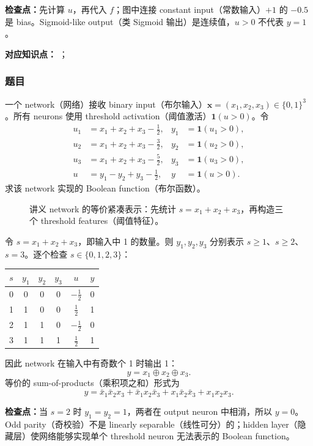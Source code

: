 \textbf{检查点：}先计算 $u$，再代入 $f$；图中连接 constant input（常数输入）$+1$ 的 $-0.5$ 是 bias。Sigmoid-like output（类 Sigmoid 输出）是连续值，$u>0$ 不代表 $y=1$。


\textbf{对应知识点：}
；

\subsubsection*{题目}

一个 network（网络）接收 binary input（布尔输入）$\bm x=(x_1,x_2,x_3)\in\{0,1\}^3$。所有 neurons 使用 threshold activation（阈值激活）$\mathbf 1(u>0)$。令
\begin{align*}
  u_1&=x_1+x_2+x_3-\tfrac12,& y_1&=\mathbf 1(u_1>0),\\
  u_2&=x_1+x_2+x_3-\tfrac32,& y_2&=\mathbf 1(u_2>0),\\
  u_3&=x_1+x_2+x_3-\tfrac52,& y_3&=\mathbf 1(u_3>0),\\
  u&=y_1-y_2+y_3-\tfrac12,& y&=\mathbf 1(u>0).
\end{align*}
求该 network 实现的 Boolean function（布尔函数）。

\begin{figure}[htbp]
  \centering
  \resizebox{0.9\textwidth}{!}{}
  \caption{讲义 network 的等价紧凑表示：先统计 $s=x_1+x_2+x_3$，再构造三个 threshold features（阈值特征）。}
  \label{fig:sc4001-l01-parity-network}
\end{figure}

\begin{checkedsolution}
令 $s=x_1+x_2+x_3$，即输入中 1 的数量。则 $y_1,y_2,y_3$ 分别表示 $s\ge1$、$s\ge2$、$s=3$。逐个检查 $s\in\{0,1,2,3\}$：
\begin{center}
\begin{tabular}{@{}cccccc@{}}
  \toprule
  $s$ & $y_1$ & $y_2$ & $y_3$ & $u$ & $y$ \\
  \midrule
  0 & 0 & 0 & 0 & $-\tfrac12$ & 0 \\
  1 & 1 & 0 & 0 & $ \tfrac12$ & 1 \\
  2 & 1 & 1 & 0 & $-\tfrac12$ & 0 \\
  3 & 1 & 1 & 1 & $ \tfrac12$ & 1 \\
  \bottomrule
\end{tabular}
\end{center}
因此 network 在输入中有奇数个 1 时输出 1：
\[
  \boxed{y=x_1\oplus x_2\oplus x_3}.
\]
等价的 sum-of-products（乘积项之和）形式为
\[
  y=\bar x_1\bar x_2x_3
   +\bar x_1x_2\bar x_3
   +x_1\bar x_2\bar x_3
   +x_1x_2x_3.
\]
\end{checkedsolution}

\textbf{检查点：}当 $s=2$ 时 $y_1=y_2=1$，两者在 output neuron 中相消，所以 $y=0$。Odd parity（奇校验）不是 linearly separable（线性可分）的；hidden layer（隐藏层）使网络能够实现单个 threshold neuron 无法表示的 Boolean function。
